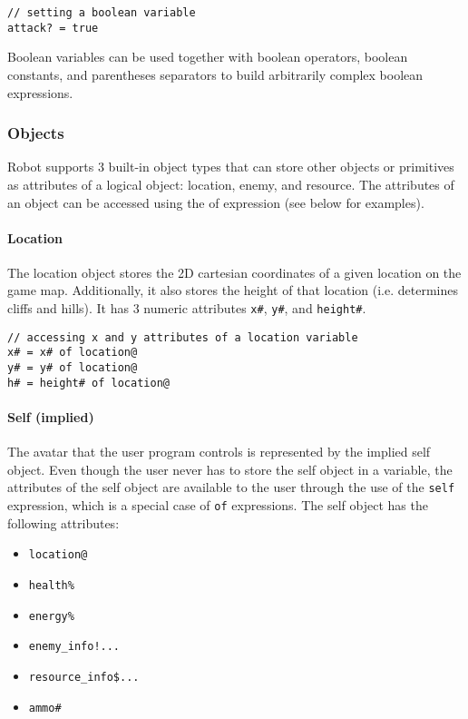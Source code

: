 \documentclass[a4paper]{article}
\begin{document}
\begin{verbatim}
// setting a boolean variable
attack? = true
\end{verbatim}

Boolean variables can be used together with boolean operators, boolean constants, and parentheses separators to build arbitrarily complex boolean expressions.

\subsubsection{Objects}

Robot supports 3 built-in object types that can store other objects or primitives as attributes of a logical object: location, enemy, and resource.  The attributes of an object can be accessed using the of expression (see below for examples).

\paragraph{Location}

The location object stores the 2D cartesian coordinates of a given location on the game map.  Additionally, it also stores the height of that location (i.e. determines cliffs and hills).  It has 3 numeric attributes \texttt{x\#}, \texttt{y\#}, and \texttt{height\#}.

\begin{verbatim}
// accessing x and y attributes of a location variable
x# = x# of location@
y# = y# of location@
h# = height# of location@
\end{verbatim}

\paragraph{Self (implied)}

The avatar that the user program controls is represented by the implied self object.  Even though the user never has to store the self object in a variable, the attributes of the self object are available to the user through the use of the \texttt{self} expression, which is a special case of \texttt{of} expressions.  The self object has the following attributes:

\begin{itemize}
	\item \texttt{location@}
	\item \texttt{health\%}
	\item \texttt{energy\%}
	\item \texttt{enemy\_info!...}
	\item \texttt{resource\_info\$...}
	\item \texttt{ammo\#}
\end{itemize}
\end{document}
